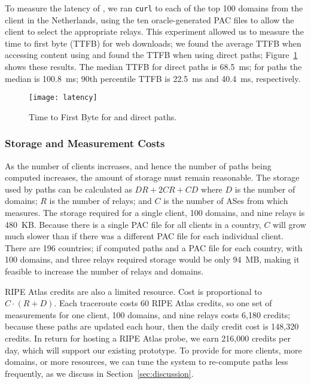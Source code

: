 To measure the latency of \system{}, we ran {\tt curl} to each of the  top 100
domains from the client in the Netherlands, using the ten oracle-generated PAC
files to allow the client to select the appropriate relays. This experiment
allowed us to measure the time to first byte (TTFB) for web downloads; we
found the average TTFB when accessing content using \system{} and  found the
TTFB when using direct paths; 
Figure~\ref{fig:latency} shows these results. The median TTFB for direct paths is
68.5~ms; for
\system{} paths the median is 100.8~ms; 90th percentile TTFB is 22.5~ms and
40.4~ms, respectively.


\begin{figure}[t]
\centering
\texttt{[image: latency]}
\caption{Time to First Byte for \system{} and direct paths.}
\label{fig:latency}
\end{figure}


\subsubsection{Storage and Measurement Costs}

As the number of clients increases, and hence the number of paths being 
computed increases, the amount of storage must remain reasonable.  The storage 
used by paths can be calculated as
$DR + 2CR + CD$
where $D$ is the number of domains; $R$ is the number of relays; and $C$ is the
number of ASes from which \system{} measures.
The storage required for a single client, 100 domains, and nine relays is
480~KB.  Because there is a single PAC file for all clients in 
a country, $C$ will grow much slower than if there was a different PAC file for 
each individual client.  There are 196 countries; if \system{} computed
paths and a PAC file for each country, with 100 domains, and 
three relays required storage would be only 94~MB, making it
feasible to increase the number of relays and domains.

RIPE Atlas credits are also a limited resource.  Cost is proportional to
$C \cdot (R+D)$.
Each traceroute costs 60 RIPE Atlas credits, so one set of measurements
for one client, 100 domains, and nine relays costs 6,180 
credits; because these paths are updated each hour, then 
the daily credit cost is 148,320 credits.  In return for hosting a RIPE Atlas 
probe, we earn 216,000 credits per day, which will support our existing 
prototype.  To provide for more clients, more domains, or more 
resources, we can tune the system to re-compute paths less frequently,
as we discuss in Section~\ref{sec:discussion}.
